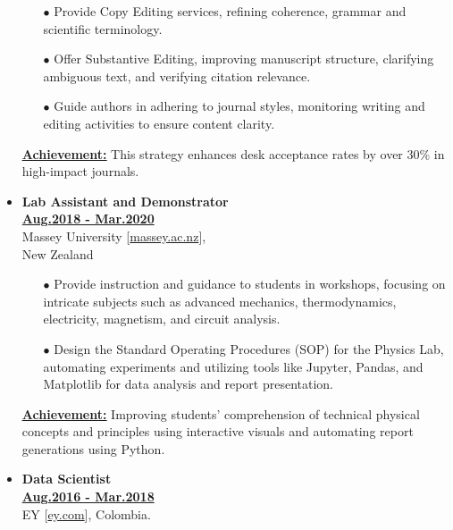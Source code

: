 \begin{itemize}[leftmargin=5mm]
\begin{itemize}[leftmargin=0mm]
              \item[$\bullet$] Provide Copy Editing services, refining coherence, grammar and scientific terminology.
              \item[$\bullet$] Offer Substantive Editing, improving manuscript structure, clarifying ambiguous text, and verifying citation relevance.
              \item[$\bullet$] Guide authors in adhering to journal styles, monitoring writing and editing activities to ensure content clarity.
          \end{itemize}

          \textbf{\href{.}{\underline{Achievement:}}}
          This strategy enhances desk acceptance rates by over 30\% in high-impact journals.


    \item \textbf{\large Lab Assistant and Demonstrator}\\
          \href{.}{\bf Aug.2018 - Mar.2020}\\
          Massey University [\href{www.massey.ac.nz}{massey.ac.nz}],\\
          New Zealand

          \begin{itemize}[leftmargin=0mm]
              \small

              \item[$\bullet$] Provide instruction and guidance to students in workshops, focusing on intricate subjects such as advanced mechanics, thermodynamics, electricity, magnetism, and circuit analysis.
              \item[$\bullet$] Design the Standard Operating Procedures (SOP) for the Physics Lab, automating experiments and utilizing tools like Jupyter, Pandas, and Matplotlib for data analysis and report presentation.
          \end{itemize}

          \textbf{\href{.}{\underline{Achievement:}}}
          Improving students' comprehension of technical physical concepts and principles using interactive visuals and automating report generations using Python.

    \item \textbf{\large Data Scientist}\\
          \href{.}{\bf Aug.2016 - Mar.2018}\\
          EY [\href{www.ey.com}{ey.com}],
          Colombia.


\end{itemize}

